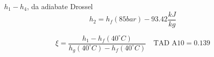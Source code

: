 

\item[c)] \( h_1 - h_4 \), da adiabate Drossel \\
    \[ h_2 = h_f (85 bar) - 93.42 \frac{kJ}{kg} \]
    
    \[
    \xi = \frac{h_1 - h_f (40^\circ C)}{h_g (40^\circ C) - h_f (40^\circ C)} \quad \text{TAD A10} = 0.139
    \]
